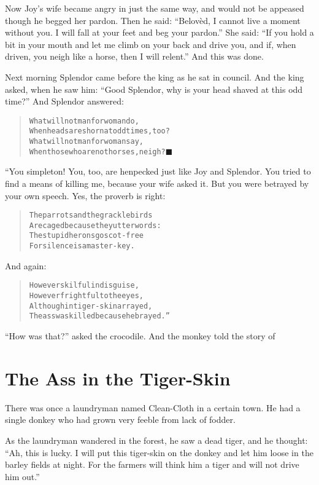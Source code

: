 \documentclass[article, twoside, 14pt]{memoir}
\newcommand{\qed}{\hfill \ensuremath{\blacksquare}}
\renewenvironment{verbatim}{%
\begin{quote}%
\vskip -10pt%
\begin{alltt}\normalfont\large}{\end{alltt}%
\end{quote}%
\vskip -10pt
} %
\begin{document}
Now Joy's wife became angry in just the same way, and would
not be appeased though he begged her pardon. Then he said:
``Belovèd, I cannot live a moment without you. I will fall at your feet and beg your pardon.''
She said:
``If you hold a bit in your mouth and let me climb on your back and drive you, and if, when driven, you neigh like a horse, then I will relent.''
And this was done.

Next morning Splendor came before the king as he sat in council.
And the king asked, when he saw him:
``Good Splendor, why is your head shaved at this odd time?'' And
Splendor answered:

\begin{verbatim}
What will not man for woman do,
When heads are shorn{\textemdash}at odd times, too?
What will not man for woman say,
When those who are not horses, neigh?\hyperref[s72]{\qed}
\end{verbatim}
“You simpleton! You, too, are henpecked just like Joy and Splendor.
You tried to find a means of killing me, because your wife asked
it. But you were betrayed by your own speech. Yes, the proverb is
right:

\begin{verbatim}
The parrots and the grackle birds
Are caged because they utter words:
The stupid herons go scot-free{\textemdash}
For silence is a master-key.
\end{verbatim}
And again:

\begin{verbatim}
However skilful in disguise,
However frightful to the eyes,
Although in tiger-skin arrayed,
The ass was killed{\textemdash}because he brayed.”
\end{verbatim}
``How was that?'' asked the crocodile. And the monkey told the
story of

\chapter{The Ass in the Tiger-Skin}

\label{s73}

There was once a laundryman named Clean-Cloth in a certain town. He
had a single donkey who had grown very feeble from lack of fodder.

As the laundryman wandered in the forest, he saw a dead tiger, and
he thought:
``Ah, this is lucky. I will put this tiger-skin on the donkey and let him loose in the barley fields at night. For the farmers will think him a tiger and will not drive him out.''
\end{document}
